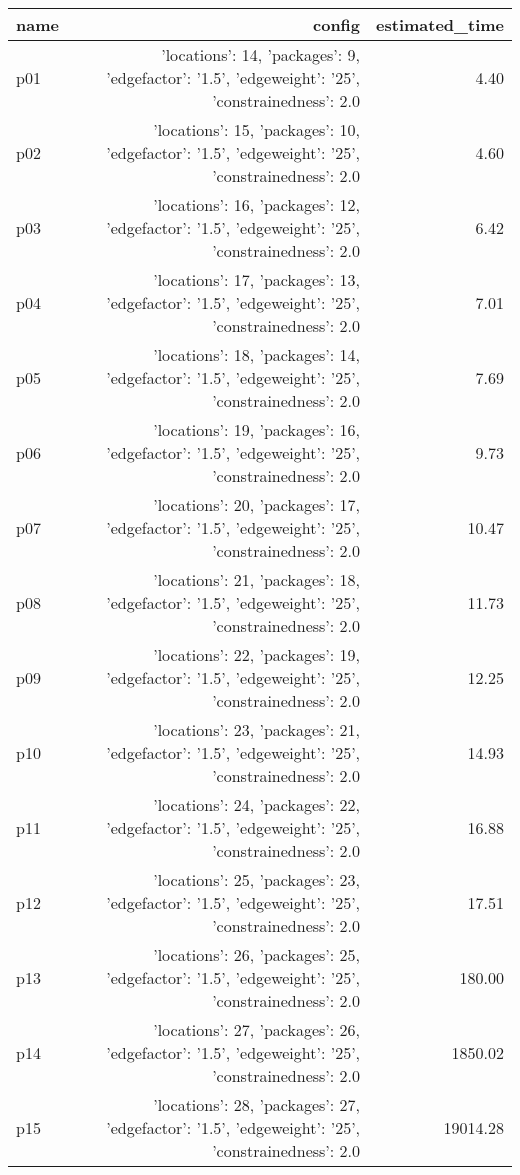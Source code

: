 \documentclass{article}
\begin{document}
                            \begin{center}
                            \scriptsize
                            \begin{tabular}{@{}l|r|r@{}}
                            name & config & estimated\_time\\\midrule
                              p01&{'locations': 14, 'packages': 9, 'edgefactor': '1.5', 'edgeweight': '25', 'constrainedness': 2.0}&4.40\\
  p02&{'locations': 15, 'packages': 10, 'edgefactor': '1.5', 'edgeweight': '25', 'constrainedness': 2.0}&4.60\\
  p03&{'locations': 16, 'packages': 12, 'edgefactor': '1.5', 'edgeweight': '25', 'constrainedness': 2.0}&6.42\\
  p04&{'locations': 17, 'packages': 13, 'edgefactor': '1.5', 'edgeweight': '25', 'constrainedness': 2.0}&7.01\\
  p05&{'locations': 18, 'packages': 14, 'edgefactor': '1.5', 'edgeweight': '25', 'constrainedness': 2.0}&7.69\\
  p06&{'locations': 19, 'packages': 16, 'edgefactor': '1.5', 'edgeweight': '25', 'constrainedness': 2.0}&9.73\\
  p07&{'locations': 20, 'packages': 17, 'edgefactor': '1.5', 'edgeweight': '25', 'constrainedness': 2.0}&10.47\\
  p08&{'locations': 21, 'packages': 18, 'edgefactor': '1.5', 'edgeweight': '25', 'constrainedness': 2.0}&11.73\\
  p09&{'locations': 22, 'packages': 19, 'edgefactor': '1.5', 'edgeweight': '25', 'constrainedness': 2.0}&12.25\\
  p10&{'locations': 23, 'packages': 21, 'edgefactor': '1.5', 'edgeweight': '25', 'constrainedness': 2.0}&14.93\\
  p11&{'locations': 24, 'packages': 22, 'edgefactor': '1.5', 'edgeweight': '25', 'constrainedness': 2.0}&16.88\\
  p12&{'locations': 25, 'packages': 23, 'edgefactor': '1.5', 'edgeweight': '25', 'constrainedness': 2.0}&17.51\\
  p13&{'locations': 26, 'packages': 25, 'edgefactor': '1.5', 'edgeweight': '25', 'constrainedness': 2.0}&180.00\\
  p14&{'locations': 27, 'packages': 26, 'edgefactor': '1.5', 'edgeweight': '25', 'constrainedness': 2.0}&1850.02\\
  p15&{'locations': 28, 'packages': 27, 'edgefactor': '1.5', 'edgeweight': '25', 'constrainedness': 2.0}&19014.28\\

\end{tabular}
\end{center}
\end{document}
